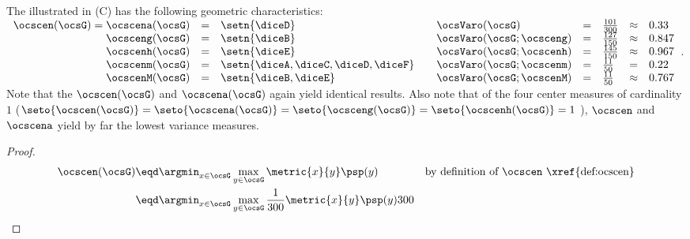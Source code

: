 \begin{tabstr}{0.75}
\begin{example} %
\label{ex:wdie}
The   illustrated in  (C) 
has the following geometric characteristics:
\\ %
\indentx$\begin{array}{rcl @{\qquad} lclcl}
    \ocscen(\ocsG)=\ocscena(\ocsG) &=&\setn{\diceD}                      & \ocsVaro(\ocsG)          &=&\frac{101}{300} &\approx& 0.33\\
    \ocsceng(\ocsG)                &=&\setn{\diceB}                      & \ocsVaro(\ocsG;\ocsceng) &=&\frac{127}{150} &\approx& 0.847 \\ 
    \ocscenh(\ocsG)                &=&\setn{\diceE}                      & \ocsVaro(\ocsG;\ocscenh) &=&\frac{145}{150} &\approx& 0.967 \\
    \ocscenm(\ocsG)                &=&\setn{\diceA,\diceC,\diceD,\diceF} & \ocsVaro(\ocsG;\ocscenm) &=&\frac{ 11}{ 50} &=&       0.22 \\
    \ocscenM(\ocsG)                &=&\setn{\diceB,\diceE}               & \ocsVaro(\ocsG;\ocscenM) &=&\frac{ 11}{ 50} &\approx& 0.767
  \end{array}$.
\\
Note that the  $\ocscen(\ocsG)$ and  $\ocscena(\ocsG)$ 
again yield identical results.
Also note that of the four center measures of cardinality $1$
($\seto{\ocscen(\ocsG)}=\seto{\ocscena(\ocsG)}=\seto{\ocsceng(\ocsG)}=\seto{\ocscenh(\ocsG)}=1$ ),
$\ocscen$ and $\ocscena$ yield by far the lowest variance measures.
\end{example}
\begin{proof}
\begin{align*}
  \ocscen(\ocsG)
    &\eqd \argmin_{x\in\ocsG}\max_{y\in\ocsG}\metric{x}{y}\psp(y)
    &&\text{by definition of $\ocscen$ \xref{def:ocscen}}
  \\&\eqd \argmin_{x\in\ocsG}\max_{y\in\ocsG}\frac{1}{300}\metric{x}{y}\psp(y)300

\end{align*}
\end{proof}
\end{tabstr}
